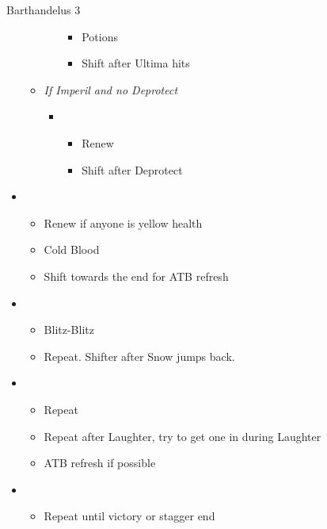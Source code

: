 \begin{battle}{Barthandelus 3}
\begin{multicols}{2}
\begin{itemize}
\begin{itemize}
\begin{itemize}
\begin{itemize}
                              \item Potions
                              \item Shift after Ultima hits
                            \end{itemize}
                    \end{itemize}
              \item \textit{If Imperil and no Deprotect}
                    \begin{itemize}
                      \item \fifth
                            \begin{itemize}
                              \item Renew
                              \item Shift after Deprotect
                            \end{itemize}
                    \end{itemize}
            \end{itemize}
      \item \sixth
            \begin{itemize}
              \item Renew if anyone is yellow health
              \item Cold Blood
              \item Shift towards the end for ATB refresh
            \end{itemize}
      \item \second
            \begin{itemize}
              \item Blitz-Blitz
              \item Repeat. Shifter after Snow jumps back.
            \end{itemize}
      \item \first
            \begin{itemize}
              \item Repeat
              \item Repeat after Laughter, try to get one in during Laughter
              \item ATB refresh if possible
            \end{itemize}
      \item \second
            \begin{itemize}
              \item Repeat until victory or stagger end
            \end{itemize}

\end{itemize}
\end{multicols}
\end{battle}
